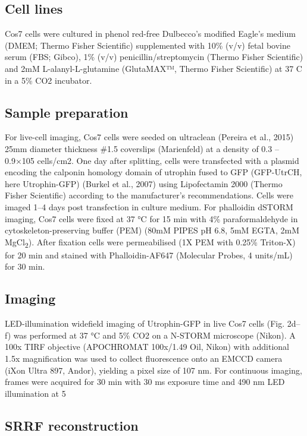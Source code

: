 \subsection{Cell lines}

Cos7 cells were cultured in phenol red-free Dulbecco’s modified Eagle’s medium (DMEM; Thermo Fisher Scientific) supplemented with 10\% (v/v) fetal bovine serum (FBS; Gibco), 1\% (v/v) penicillin/streptomycin (Thermo Fisher Scientific) and 2mM L-alanyl-L-glutamine (GlutaMAX™, Thermo Fisher Scientific) at 37 \degree C in a 5\% CO2 incubator.

\subsection{Sample preparation}

For live-cell imaging, Cos7 cells were seeded on ultraclean (Pereira et al., 2015) 25mm diameter thickness \#1.5 coverslips (Marienfeld) at a density of 0.3 – 0.9×105 cells/cm2. One day after splitting, cells were transfected with a plasmid encoding the calponin homology domain of utrophin fused to GFP (GFP-UtrCH, here Utrophin-GFP) (Burkel et al., 2007) using Lipofectamin 2000 (Thermo Fisher Scientific) according to the manufacturer’s recommendations. Cells were imaged 1–4 days post transfection in culture medium. For phalloidin dSTORM imaging, Cos7 cells were fixed at 37 °C for 15 min with 4\% paraformaldehyde in cytoskeleton-preserving buffer (PEM) (80mM PIPES pH 6.8, 5mM EGTA, 2mM MgCl\textsubscript{2}). After fixation cells were permeabilised (1X PEM with 0.25\% Triton-X) for 20 min and stained with Phalloidin-AF647 (Molecular Probes, 4 units/mL) for 30 min.

\subsection{Imaging}

LED-illumination widefield imaging of Utrophin-GFP in live Cos7 cells (Fig. 2d–f) was performed at 37 °C and 5\% CO2 on a N-STORM microscope (Nikon). A 100x TIRF objective (APOCHROMAT 100x/1.49 Oil, Nikon) with additional 1.5x magnification was used to collect fluorescence onto an EMCCD camera (iXon Ultra 897, Andor), yielding a pixel size of 107 nm. For continuous imaging, frames were acquired for 30 min with 30 ms exposure time and 490 nm LED illumination at 5%

\subsection{SRRF reconstruction}

